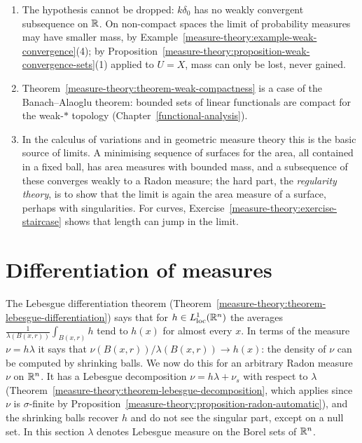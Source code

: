 \begin{remark}\label{measure-theory:remark-weak-compactness}
\begin{enumerate}
\item The hypothesis cannot be dropped: $k\delta_0$ has no weakly convergent subsequence on $\mathbb{R}$. On non-compact spaces the limit of probability measures may have smaller mass, by
Example~\ref{measure-theory:example-weak-convergence}(4); by Proposition~\ref{measure-theory:proposition-weak-convergence-sets}(1) applied to $U = X$, mass can only be lost, never gained.
\item Theorem~\ref{measure-theory:theorem-weak-compactness} is a case of the Banach--Alaoglu theorem: bounded sets of linear functionals are compact for the weak-$*$ topology
(Chapter~\ref{functional-analysis}).
\item In the calculus of variations and in geometric measure theory this is the basic source of limits. A minimising sequence of surfaces for the area, all contained in a fixed ball, has area
measures with bounded mass, and a subsequence of these converges weakly to a Radon measure; the hard part, the \emph{regularity theory}, is to show that the limit is again the area measure of a
surface, perhaps with singularities. For curves, Exercise~\ref{measure-theory:exercise-staircase} shows that length can jump in the limit.
\end{enumerate}
\end{remark}

\section{Differentiation of measures}\label{measure-theory:section-differentiation-measures}

The Lebesgue differentiation theorem (Theorem~\ref{measure-theory:theorem-lebesgue-differentiation}) says that for $h \in L^1_{\mathrm{loc}}(\mathbb{R}^n)$ the averages $\frac1{\lambda(B(x, r))}\int_{B(x, r)}h$
tend to $h(x)$ for almost every $x$. In terms of the measure $\nu = h\lambda$ it says that $\nu(B(x, r))/\lambda(B(x, r)) \to h(x)$: the density of $\nu$ can be computed by shrinking balls. We now do this
for an arbitrary Radon measure $\nu$ on $\mathbb{R}^n$. It has a Lebesgue decomposition $\nu = h\lambda + \nu_s$ with respect to $\lambda$ (Theorem~\ref{measure-theory:theorem-lebesgue-decomposition}, which
applies since $\nu$ is $\sigma$-finite by Proposition~\ref{measure-theory:proposition-radon-automatic}), and the shrinking balls recover $h$ and do not see the singular part, except on a null set. In this
section $\lambda$ denotes Lebesgue measure on the Borel sets of $\mathbb{R}^n$.


